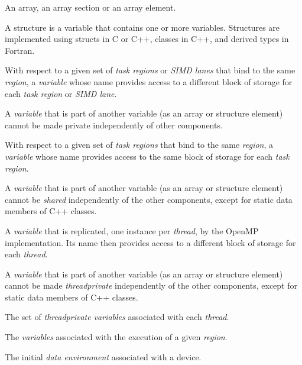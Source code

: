 \glossarydefstart
An array, an array section or an array element.
\glossarydefend

\glossarydefstart
A structure is a variable that contains one or more variables. Structures are implemented using structs in C or C++, classes in C++, and derived types in Fortran.
\glossarydefend

\glossarydefstart
With respect to a given set of \emph{task regions} or \emph{SIMD lanes} that bind to the same
 \emph{region}, a \emph{variable} whose name provides access to a different block of 
storage for each \emph{task region} or \emph{SIMD lane}.

A \emph{variable} that is part of another variable (as an array or structure element) cannot 
be made private independently of other components.
\glossarydefend

\glossarydefstart
With respect to a given set of \emph{task regions} that bind to the same  
\emph{region}, a \emph{variable} whose name provides access to the same block of storage for 
each \emph{task region}.

A \emph{variable} that is part of another variable (as an array or structure element) cannot 
be \emph{shared} independently of the other components, except for static data members 
of C++ classes.
\glossarydefend

\glossarydefstart
A \emph{variable} that is replicated, one instance per \emph{thread}, by the OpenMP 
implementation. Its name then provides access to a different block of storage for 
each \emph{thread}.

A \emph{variable} that is part of another variable (as an array or structure element) cannot 
be made \emph{threadprivate} independently of the other components, except for static 
data members of C++ classes. 
\glossarydefend

\glossarydefstart
The set of \emph{threadprivate variables} associated with each \emph{thread}.
\glossarydefend

\glossarydefstart
The \emph{variables} associated with the execution of a given \emph{region}. 
\glossarydefend

\glossarydefstart
The initial \emph{data environment} associated with a device.
\glossarydefend
\bigskip

